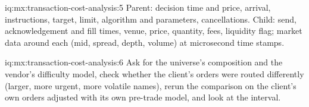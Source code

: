 \begin{solution}{iq:mx:transaction-cost-analysis:5}
Parent: decision time and price, arrival, instructions, target, limit, algorithm and parameters, cancellations. Child: send, acknowledgement and fill
times, venue, price, quantity, fees, liquidity flag; market data around each (mid, spread, depth, volume) at microsecond time stamps.
\end{solution}

\begin{solution}{iq:mx:transaction-cost-analysis:6}
Ask for the universe's composition and the vendor's difficulty model, check whether the client's orders were routed differently (larger, more urgent,
more volatile names), rerun the comparison on the client's own orders adjusted with its own pre-trade model, and look at the interval.
\end{solution}
